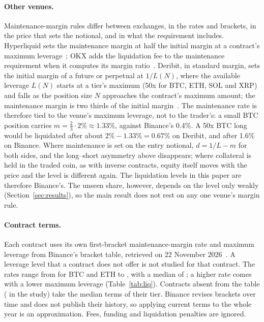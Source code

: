 \paragraph{Other venues.} Maintenance-margin rules differ between exchanges, in the rates and
brackets, in the price that sets the notional, and in what the requirement includes. Hyperliquid sets
the maintenance margin at half the initial margin at a contract's maximum leverage~\cite{hl-margin};
OKX adds the liquidation fee to the maintenance requirement when it computes its margin
ratio~\cite{okx-margin}. Deribit, in standard margin, sets the initial margin of a future or
perpetual at $1/L(N)$, where the available leverage $L(N)$ starts at a tier's maximum (50x for BTC,
ETH, SOL and XRP) and falls as the position size $N$ approaches the contract's maximum amount; the
maintenance margin is two thirds of the initial margin~\cite{deribit-sm}. The maintenance rate is
therefore tied to the venue's maximum leverage, not to the trader's: a small BTC position carries
$m=\tfrac23\cdot 2\% \approx 1.33\%$, against Binance's 0.4\%. A 50x BTC long would be liquidated after
about $2\%-1.33\%=0.67\%$ on Deribit, and after 1.6\% on Binance. Where maintenance is set on the entry notional, $d=1/L-m$ for both sides, and
the long--short asymmetry above disappears; where collateral is held in the traded coin, as with
inverse contracts, equity itself moves with the price and the level is different again. The
liquidation levels in this paper are therefore Binance's. The unseen share, however, depends on the
level only weakly (Section~\ref{sec:results}), so the main result does not rest on any one venue's
margin rule.

\paragraph{Contract terms.} Each contract uses its own first-bracket maintenance-margin rate and
maximum leverage from Binance's bracket table, retrieved on 22 November 2026~\cite{binance-brackets}.
A leverage level that a contract does not offer is not studied for that contract. The rates range
from \MMRBTC{} for BTC and ETH to \MMRMax{}, with a median of \MMRMedian{}; a higher rate comes with
a lower maximum leverage (Table~\ref{tab:liq}). Contracts
absent from the table (\FallbackN{} in the study) take the median terms of their tier. Binance
revises brackets over time and does not publish their history, so applying current terms to the whole
year is an approximation. Fees, funding and liquidation penalties are ignored.

